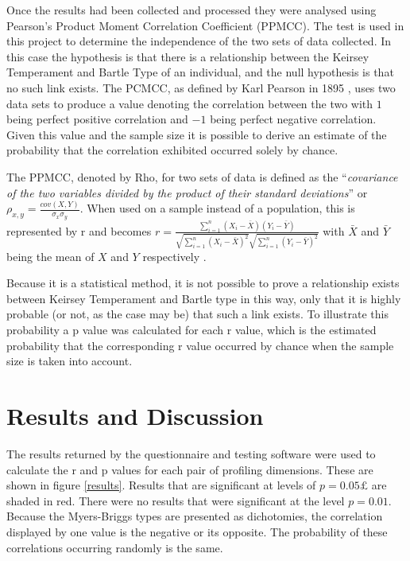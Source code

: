 \documentclass[12pt,a4paper,twoside]{report}
\begin{document}
Once the results had been collected and processed they were analysed using Pearson's Product Moment Correlation Coefficient (PPMCC). The test is used in this project to determine the independence of the two sets of data collected. In this case the hypothesis is that there is a relationship between the Keirsey Temperament and Bartle Type of an individual, and the null hypothesis is that no such link exists. The PCMCC, as defined by Karl Pearson in 1895 \cite{pearson1895note}, uses two data sets to produce a value denoting the correlation between the two with $1$ being perfect positive correlation and $-1$ being perfect negative correlation. Given this value and the sample size it is possible to derive an estimate of the probability that the correlation exhibited occurred solely by chance. 

The PPMCC, denoted by Rho, for two sets of data is defined as the ``\textit{covariance of the two variables divided by the product of their standard deviations}'' \cite{wiki-ppmcc} or $\rho_{x,y}=\frac{cov(X,Y)}{\sigma_x \sigma_y}$. When used on a sample instead of a population, this is represented by r and becomes $r=\frac{\sum_{i=1}^{n}(X_i-\bar{X})(Y_i-\bar{Y})}{\sqrt{\sum_{i=1}^{n}(X_i-\bar{X})^2}\sqrt{\sum_{i=1}^{n}(Y_i-\bar{Y})^2}}$ with $\bar{X}$ and $\bar{Y}$ being the mean of $X$ and $Y$ respectively \cite{pearson1895note}. 

\vspace{0.1cm}
Because it is a statistical method, it is not possible to prove a relationship exists between Keirsey Temperament and Bartle type in this way, only that it is highly probable (or not, as the case may be) that such a link exists. To illustrate this probability a p value was calculated for each r value, which is the estimated probability that the corresponding r value occurred by chance when the sample size is taken into account.

\section{Results and Discussion}
The results returned by the questionnaire and testing software were used to calculate the r and p values for each pair of profiling dimensions. These are shown in figure \ref{results}. Results that are significant at levels of $p = 0.05£$ are shaded in red. There were no results that were significant at the level $p = 0.01$. Because the Myers-Briggs types are presented as dichotomies, the correlation displayed by one value is the negative or its opposite. The probability of these correlations occurring randomly is the same.
\end{document}
